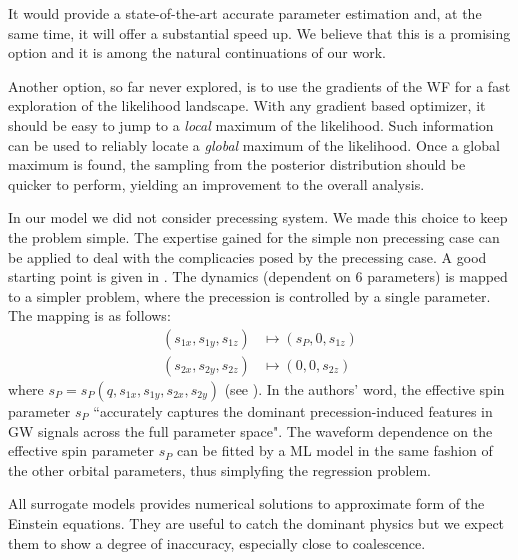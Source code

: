 It would provide a state-of-the-art accurate parameter estimation and, at the same time, it will offer a substantial speed up.
We believe that this is a promising option and it is among the natural continuations of our work.
\par
Another option, so far never explored, is to use the gradients of the WF for a fast exploration of the likelihood landscape. With any gradient based optimizer, it should be easy to jump to a \textit{local} maximum of the likelihood. Such information can be used to reliably locate a \textit{global} maximum of the likelihood. Once a global maximum is found, the sampling from the posterior distribution should be quicker to perform, yielding an improvement to the overall analysis.
\par
In our model we did not consider precessing system. We made this choice to keep the problem simple.
The expertise gained for the simple non precessing case can be applied to deal with the complicacies posed by the precessing case.
A good starting point is given in \cite{Schmidt2015Precession}. The dynamics (dependent on 6 parameters) is mapped to a simpler problem, where the precession is controlled by a single parameter. The mapping is as follows:
\begin{align*}
	(s_{1x},s_{1y}, s_{1z}) &\longmapsto (s_{P},0, s_{1z})\\
	(s_{2x},s_{2y}, s_{2z}) &\longmapsto (0, 0, s_{2z})
\end{align*}
where $s_P = s_P(q,s_{1x},s_{1y}, s_{2x},s_{2y})$ (see \cite[eq. 3]{Schmidt2015Precession}).
In the authors' word, the effective spin parameter $s_{P}$ ``accurately captures the dominant precession-induced features in GW signals across the full parameter space".
The waveform dependence on the effective spin parameter $s_P$ can be fitted by a ML model in the same fashion of the other orbital parameters, thus simplyfing the regression problem.
\par
All surrogate models provides numerical solutions to approximate form of the Einstein equations. They are useful to catch the dominant physics but we expect them to show a degree of inaccuracy, especially close to coalescence.
